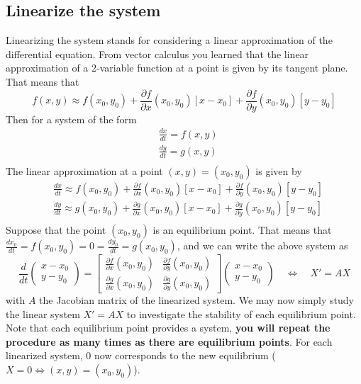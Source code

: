 \subsection{Linearize the system} Linearizing the system stands for considering a linear approximation of the differential equation. From vector calculus you learned that the linear approximation of a 2-variable function at a point is given by its tangent plane. That means that 
\[ f(x,y) \approx  f(x_0,y_0) + \frac{\partial f}{\partial x}(x_0,y_0) [x- x_0] + \frac{\partial f}{\partial y}(x_0,y_0) [y- y_0]\]
Then for a system of the form
\[
\begin{aligned}
& \displaystyle \frac{d x}{dt} = f(x,y)\\
& \displaystyle \frac{d y}{dt} = g(x,y)\\
\end{aligned}
\]
The linear approximation at a point $(x,y) = (x_0,y_0)$ is given by
\[
\begin{aligned}
& \displaystyle \frac{d x}{dt}  \approx  f(x_0,y_0) + \frac{\partial f}{\partial x}(x_0,y_0) [x- x_0] + \frac{\partial f}{\partial y}(x_0,y_0) [y- y_0]\\
& \displaystyle \frac{d y}{dt}  \approx  g(x_0,y_0) + \frac{\partial g}{\partial x}(x_0,y_0) [x- x_0] + \frac{\partial g}{\partial y}(x_0,y_0) [y- y_0]\\
\end{aligned}
\]
Suppose that the point $(x_0,y_0)$ is an equilibrium point. That means that $\frac{d x_0}{dt}  = f(x_0,y_0) =  0 = \frac{d y_0}{dt}  = g(x_0,y_0)  $, and we can write the above system as 
\[ 
\displaystyle \frac{d }{dt} \begin{pmatrix}
x - x_0 \\y - y_0
\end{pmatrix} = \begin{bmatrix}
\displaystyle\frac{\partial f}{\partial x}(x_0,y_0) &\displaystyle  \frac{\partial f}{\partial y}(x_0,y_0)\\
\displaystyle\frac{\partial g}{\partial x}(x_0,y_0) &\displaystyle \frac{\partial g}{\partial y}(x_0,y_0)
\end{bmatrix} \begin{pmatrix}
x -x_0\\y- y_0
\end{pmatrix} \quad \Longleftrightarrow \quad  X' = A X
\]
with $A$ the Jacobian matrix of the linearized system. We may now simply study the linear system $ X' = A X$ to investigate the stability of each equilibrium point. Note that each equilibrium point provides a system, \textbf{you will repeat the procedure as many times as there are equilibrium points}. For each linearized system, $0$ now corresponds to the new equilibrium ($X = 0 \Longleftrightarrow (x,y) = (x_0,y_0)$).\\

